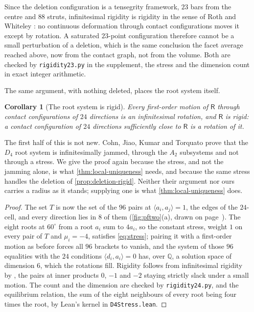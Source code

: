 \documentclass[11pt,reqno]{amsart}
\renewcommand{\_}{\origunderscore\allowbreak}
\numberwithin{equation}{section}
\theoremstyle{plain}
\newtheorem{cor}[thm]{Corollary}
\theoremstyle{definition}
\theoremstyle{remark}
\newcommand{\Rt}{\mathsf{R}}                 %
\begin{document}
Since the deletion configuration is a tensegrity framework, $23$ bars
from the centre and $88$ struts, infinitesimal rigidity is rigidity in
the sense of Roth and Whiteley \cite[Thm.~5.7]{RW81}: no continuous
deformation through contact configurations moves it except by rotation.
A saturated $23$-point configuration therefore cannot be a small
perturbation of a deletion, which is the same conclusion the facet
average reached above, now from the contact graph, not from the volume. Both are checked by \texttt{rigidity23.py} in the supplement,
the stress and the dimension count in exact integer arithmetic.

The same argument, with nothing deleted, places the root system itself.

\begin{cor}[The root system is rigid]\label{cor:root-rigid}
Every first-order motion of $\Rt$ through contact configurations of
$24$ directions is an infinitesimal rotation, and $\Rt$ is rigid: a
contact configuration of $24$ directions sufficiently close to $\Rt$
is a rotation of it.
\end{cor}

The first half of this is not new. Cohn, Jiao, Kumar and Torquato
\cite[Prop.~3.3]{CJKT11} prove that the $D_4$ root system is
infinitesimally jammed, through the $A_2$ subsystems and not through a stress. We give the proof again because the stress, and not
the jamming alone, is what \cref{thm:local-uniqueness} needs, and
because the same stress handles the deletion of
\cref{prop:deletion-rigid}. Neither their argument nor ours carries a
radius as it stands; supplying one is what \cref{thm:local-uniqueness}
does.

\begin{proof}
The set $T$ is now the set of the $96$ pairs at $\langle a_i,a_j\rangle=1$,
the edges of the $24$-cell, and every direction lies in $8$ of them
(\cref{fig:pftwo}(a), drawn on page~\pageref{fig:pftwo}). The eight roots at $60^\circ$ from a root
$a_i$ sum to $4a_i$, so the constant stress, weight $1$ on every pair of
$T$ and $\mu_i=-4$, satisfies \eqref{eq:stress}; pairing it with a
first-order motion as before forces all $96$ brackets to vanish, and the
system of those $96$ equalities with the $24$ conditions
$\langle d_i,a_i\rangle=0$ has, over $\mathbb{Q}$, a solution space of
dimension $6$, which the rotations fill. Rigidity follows from
infinitesimal rigidity by \cite[Thm.~5.7]{RW81}, the pairs at inner
products $0$, $-1$ and $-2$ staying strictly slack under a small motion.
The count and the dimension are checked by \texttt{rigidity24.py}, and
the equilibrium relation, the sum of the eight neighbours of every root
being four times the root, by Lean's kernel in \texttt{D4Stress.lean}.
\end{proof}
\end{document}

